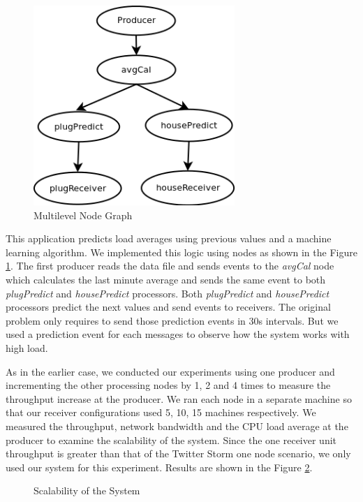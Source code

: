 \begin{figure}[!t]
        \centering
        \includegraphics[width=3.0in]{multigraph.png}
        \caption{Multilevel Node Graph}
        \label{multigraph}
\end{figure}

This application predicts load averages using previous values and a machine learning algorithm. We implemented this logic using nodes as shown in the Figure \ref{multigraph}. The first producer reads the data file and sends events to the \textit{avgCal} node which calculates the last minute average and sends the same event to both \textit{plugPredict} and \textit{housePredict} processors. Both \textit{plugPredict} and \textit{housePredict} processors predict the next values and send events to receivers. The original problem only requires to send those prediction events in 30s intervals. But we used a prediction event for each messages to observe how the system works with high load.
 
As in the earlier case, we conducted our experiments using one producer and incrementing the other processing nodes by 1, 2 and 4 times to measure the throughput increase at the producer. We ran each node in a separate machine so that our receiver configurations used 5, 10, 15 machines respectively. We measured the throughput,  network bandwidth and the CPU load average at the producer to examine the scalability of the system. Since the one receiver unit throughput is greater than that of the Twitter Storm one node scenario, we only used our system for this experiment.  Results are shown in the Figure \ref{scalability}.


\begin{figure}[!t]
        \centering
        \hfil
        \hfil
        \hfil
        \caption{Scalability of the System}
        \label{scalability}
\end{figure}


